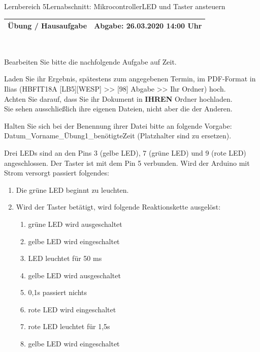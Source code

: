 \documentclass[oneside,openany,headings=optiontotoc,11pt,numbers=noenddot]{scrreprt}
\begin{document}
	\begin{worksheet}{Lernbereich 5}{Lernabschnitt: Mikrocontroller}{LED und Taster ansteuern}
		\begin{framed}
			\noindent
			\begin{tabularx}{0.98\textwidth}{Xr}
				\textbf{Übung / Hausaufgabe} & Abgabe: 26.03.2020 14:00 Uhr\\
				\hline
			\end{tabularx}\\
			\par\noindent
			Bearbeiten Sie bitte die nachfolgende Aufgabe auf Zeit.\\
			\par\noindent
			Laden Sie ihr Ergebnis, spätestens zum angegebenen Termin, im PDF-Format in Ilias (HBFIT18A [LB5][WESP] >> [98] Abgabe >> Ihr Ordner) hoch.\\
			Achten Sie darauf, dass Sie ihr Dokument in \textbf{IHREN} Ordner hochladen.\\
			Sie sehen ausschließlich ihre eigenen Dateien, nicht aber die der Anderen.\\
			\par\noindent
			Halten Sie sich bei der Benennung ihrer Datei bitte an folgende Vorgabe: Datum\_Vorname\_Übung1\_benötigteZeit (Platzhalter sind zu ersetzen).\\ 
		\end{framed}
		\begin{framed}
			\noindent
			Drei LEDs sind an den Pins 3 (gelbe LED), 7 (grüne LED) und 9 (rote LED) angeschlossen. Der Taster ist mit dem Pin 5 verbunden. Wird der Arduino mit Strom versorgt passiert folgendes:
			\begin{enumerate}
				\item Die grüne LED beginnt zu leuchten.
				\item Wird der Taster betätigt, wird folgende Reaktionskette ausgelöst:
				\begin{enumerate}[label=\Alph* - ]
					\item grüne LED wird ausgeschaltet
					\item gelbe LED wird eingeschaltet
					\item LED leuchtet für 50 ms
					\item gelbe LED wird ausgeschaltet
					\item 0,1s passiert nichts
					\item rote LED wird eingeschaltet
					\item rote LED leuchtet für 1,5s
					\item gelbe LED wird eingeschaltet

\end{enumerate}
\end{enumerate}
\end{framed}
\end{worksheet}
\end{document}
